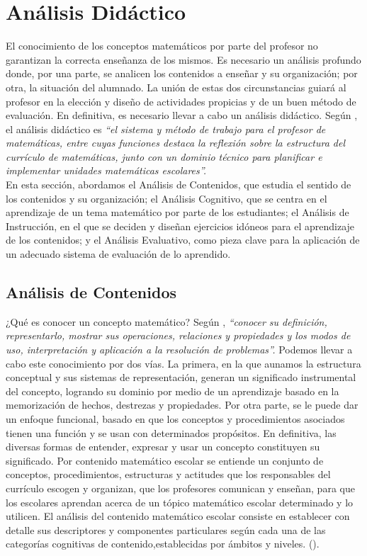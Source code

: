 \documentclass[../main.tex]{memoir}
\begin{document}
\chapter{Análisis Didáctico}
\label{sec:analisis-didactico}

El conocimiento de los conceptos matemáticos por parte del profesor no garantizan la correcta enseñanza de los mismos. Es necesario un análisis profundo donde, por una parte, se analicen los contenidos a enseñar y su organización; por otra, la situación del alumnado. La unión de estas dos circunstancias guiará al profesor en la elección y diseño de actividades propicias y de un buen método de evaluación. En definitiva, es necesario llevar  a cabo un análisis didáctico. Según \cite{rico2016}, el análisis didáctico es \textit{``el sistema y método de trabajo para el profesor de matemáticas, entre cuyas funciones destaca la reflexión sobre la estructura del currículo de matemáticas, junto con un dominio técnico para planificar e implementar unidades matemáticas escolares''.} \\

En esta sección, abordamos el Análisis de Contenidos, que estudia el sentido de los contenidos y su organización; el Análisis Cognitivo, que se centra en el aprendizaje de un tema matemático por parte de los estudiantes; el Análisis de Instrucción, en el que se deciden y diseñan ejercicios idóneos para el aprendizaje de los contenidos; y el Análisis Evaluativo, como pieza clave para la aplicación de un adecuado sistema de evaluación de lo aprendido.

\section{Análisis de Contenidos}

¿Qué es conocer un concepto matemático? Según \cite{rico2016}, \textit{``conocer su definición, representarlo, mostrar sus operaciones, relaciones y propiedades y los modos de uso, interpretación y aplicación a la resolución de problemas''.} Podemos llevar a cabo este conocimiento por dos vías. La primera, en la que aunamos la estructura conceptual y sus sistemas de representación, generan un significado instrumental del concepto, logrando su dominio por medio de un aprendizaje basado en la memorización de hechos, destrezas y propiedades. Por otra parte, se le puede dar un enfoque funcional, basado en que los conceptos y procedimientos asociados tienen una función y se usan con determinados propósitos. En definitiva, las diversas formas de entender, expresar y usar un concepto constituyen su significado. Por contenido matemático escolar se entiende un conjunto de conceptos, procedimientos, estructuras y actitudes que los responsables del currículo escogen y organizan, que los profesores comunican y enseñan, para que los escolares aprendan acerca de un tópico matemático escolar determinado y lo utilicen. El análisis del contenido matemático escolar consiste en establecer con detalle sus descriptores y componentes particulares según cada una de las categorías cognitivas de contenido,establecidas por ámbitos y niveles. (\cite{rico2016}). \\
\end{document}
